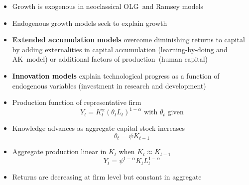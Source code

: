 \documentclass[notes=show]{beamer}
\begin{document}
\begin{frame}%


\begin{itemize}
\item Growth is exogenous in neoclassical OLG\ and Ramsey models

\item Endogenous growth models seek to explain growth

\item \textbf{Extended accumulation} \textbf{models} overcome diminishing
returns to capital by adding externalities in capital accumulation
(learning-by-doing and AK\ model) or additional factors of production\
(human capital)

\item \textbf{Innovation models} explain technological progress as a
function of endogenous variables (investment in research and development)
\end{itemize}

\end{frame}%

\begin{frame}%


\begin{itemize}
\item Production function of representative firm%
\begin{equation*}
Y_{t}=K_{t}^{\alpha }\left( \theta _{t}L_{t}\right) ^{1-\alpha }\text{ with }%
\theta _{t}\text{ given}
\end{equation*}

\item Knowledge advances as aggregate capital stock increases%
\begin{equation*}
\theta _{t}=\psi K_{t-1}
\end{equation*}

\item Aggregate production linear in $K_{t}$ when $K_{t}\approx K_{t-1}$ 
\begin{equation*}
Y_{t}=\psi ^{1-\alpha }K_{t}L_{t}^{1-\alpha }
\end{equation*}

\item Returns are decreasing at firm level but constant in aggregate
\end{itemize}

\end{frame}%
\end{document}
